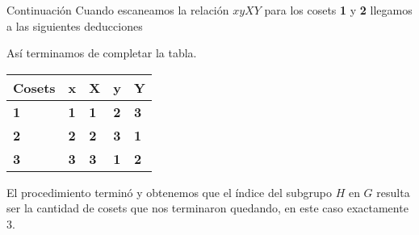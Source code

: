 \documentclass[aspectratio=169, 9pt]{beamer}
\begin{document}
\begin{frame}[fragile]{Continuación}
	Cuando escaneamos la relación $xyXY$ para los cosets \textbf{1} y \textbf{2} 
	llegamos a las siguientes deducciones 
	
	\begin{center}
	\end{center}

\pause
	Así terminamos de completar la tabla.
	
	\begin{table}[]
		\begin{tabular}{|l|l|l|l|l|}
			\hline
			Cosets     & x          & X          & y          & Y          \\ \hline
			\textbf{1} & \textbf{1} & \textbf{1} & \textbf{2} & \textbf{3} \\ \hline
			\textbf{2} & \color{verde}\textbf{2} & \color{verde}\textbf{2} & \textbf{3} & \textbf{1} \\ \hline
			\textbf{3} & \color{verde}\textbf{3} & \color{verde}\textbf{3} & \textbf{1} & \textbf{2} \\ \hline
		\end{tabular}
	\end{table}
	
	El procedimiento terminó y obtenemos que el índice del subgrupo $H$ en $G$ resulta ser la cantidad de cosets que nos terminaron quedando, en este caso exactamente $3$.
\end{frame}
\end{document}
